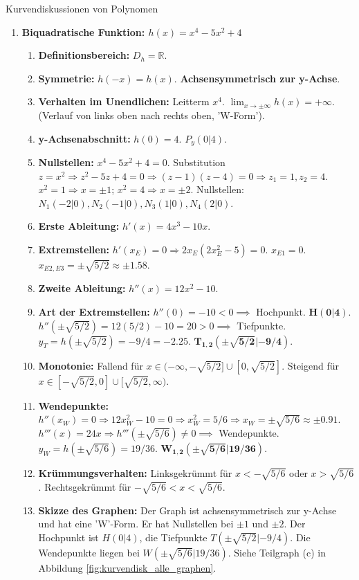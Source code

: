 \begin{loesungsumgebung}{Kurvendiskussionen von Polynomen}
\begin{enumerate}[label=(\alph*)]
    \item \textbf{Biquadratische Funktion: $h(x) = x^4 - 5x^2 + 4$}
    \begin{enumerate}[label=\arabic*.]
        \item \textbf{Definitionsbereich:} $D_h = \mathbb{R}$.
        \item \textbf{Symmetrie:} $h(-x) = h(x)$. \textbf{Achsensymmetrisch zur y-Achse}.
        \item \textbf{Verhalten im Unendlichen:} Leitterm $x^4$. $\lim_{x \to \pm \infty} h(x) = +\infty$. (Verlauf von links oben nach rechts oben, 'W-Form').
        \item \textbf{y-Achsenabschnitt:} $h(0) = 4$. $P_y(0|4)$.
        \item \textbf{Nullstellen:} $x^4 - 5x^2 + 4 = 0$. Substitution $z=x^2 \Rightarrow z^2 - 5z + 4 = 0 \Rightarrow (z-1)(z-4)=0 \Rightarrow z_1=1, z_2=4$.
        $x^2=1 \Rightarrow x=\pm 1$; $x^2=4 \Rightarrow x=\pm 2$. Nullstellen: $N_1(-2|0), N_2(-1|0), N_3(1|0), N_4(2|0)$.
        \item \textbf{Erste Ableitung:} $h'(x) = 4x^3 - 10x$.
        \item \textbf{Extremstellen:} $h'(x_E)=0 \Rightarrow 2x_E(2x_E^2-5)=0$.
        $x_{E1}=0$. $x_{E2,E3}=\pm\sqrt{5/2} \approx \pm 1.58$.
        \item \textbf{Zweite Ableitung:} $h''(x) = 12x^2 - 10$.
        \item \textbf{Art der Extremstellen:}
        $h''(0) = -10 < 0 \implies$ Hochpunkt. $\mathbf{H(0|4)}$.
        $h''(\pm\sqrt{5/2}) = 12(5/2)-10=20 > 0 \implies$ Tiefpunkte.
        $y_T = h(\pm\sqrt{5/2}) = -9/4=-2.25$. $\mathbf{T_{1,2}(\pm\sqrt{5/2}|-9/4)}$.
        \item \textbf{Monotonie:} Fallend für $x \in (-\infty, -\sqrt{5/2}] \cup [0, \sqrt{5/2}]$. Steigend für $x \in [-\sqrt{5/2}, 0] \cup [\sqrt{5/2}, \infty)$.
        \item \textbf{Wendepunkte:} $h''(x_W)=0 \Rightarrow 12x_W^2-10=0 \Rightarrow x_W^2=5/6 \Rightarrow x_W=\pm\sqrt{5/6} \approx \pm 0.91$.
        $h'''(x)=24x \Rightarrow h'''(\pm\sqrt{5/6}) \neq 0 \implies$ Wendepunkte.
        $y_W = h(\pm\sqrt{5/6}) = 19/36$. $\mathbf{W_{1,2}(\pm\sqrt{5/6}|19/36)}$.
        \item \textbf{Krümmungsverhalten:} Linksgekrümmt für $x < -\sqrt{5/6}$ oder $x > \sqrt{5/6}$. Rechtsgekrümmt für $-\sqrt{5/6} < x < \sqrt{5/6}$.
        \item \textbf{Skizze des Graphen:} Der Graph ist achsensymmetrisch zur y-Achse und hat eine 'W'-Form. Er hat Nullstellen bei $\pm 1$ und $\pm 2$. Der Hochpunkt ist $H(0|4)$, die Tiefpunkte $T(\pm\sqrt{5/2}|-9/4)$. Die Wendepunkte liegen bei $W(\pm\sqrt{5/6}|19/36)$. Siehe Teilgraph (c) in Abbildung \ref{fig:kurvendisk_alle_graphen}.
    \end{enumerate}


\end{enumerate}
\end{loesungsumgebung}

